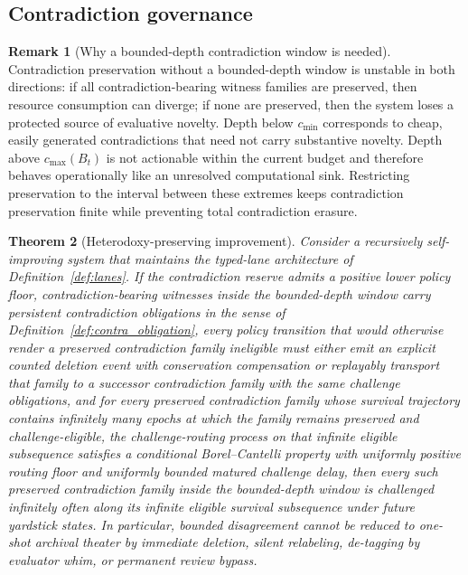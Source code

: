 \documentclass[11pt]{article}
\newtheorem{theorem}{Theorem}[section]
\theoremstyle{definition}
\newtheorem{remark}[theorem]{Remark}
\newcommand{\1}{\mathbf{1}}
\begin{document}
\subsection{Contradiction governance}
\begin{remark}[Why a bounded-depth contradiction window is needed]\label{rem:bounded_depth_need}
Contradiction preservation without a bounded-depth window is unstable in both directions: if all contradiction-bearing witness families are preserved, then resource consumption can diverge; if none are preserved, then the system loses a protected source of evaluative novelty. Depth below $c_{\min}$ corresponds to cheap, easily generated contradictions that need not carry substantive novelty. Depth above $c_{\max}(B_t)$ is not actionable within the current budget and therefore behaves operationally like an unresolved computational sink. Restricting preservation to the interval between these extremes keeps contradiction preservation finite while preventing total contradiction erasure.
\end{remark}

\begin{theorem}[Heterodoxy-preserving improvement]\label{thm:heterodoxy}
Consider a recursively self-improving system that maintains the typed-lane architecture of Definition~\ref{def:lanes}. If the contradiction reserve admits a positive lower policy floor, contradiction-bearing witnesses inside the bounded-depth window carry persistent contradiction obligations in the sense of Definition~\ref{def:contra_obligation}, every policy transition that would otherwise render a preserved contradiction family ineligible must either emit an explicit counted deletion event with conservation compensation or replayably transport that family to a successor contradiction family with the same challenge obligations, and for every preserved contradiction family whose survival trajectory contains infinitely many epochs at which the family remains preserved and challenge-eligible, the challenge-routing process on that infinite eligible subsequence satisfies a conditional Borel--Cantelli property with uniformly positive routing floor and uniformly bounded matured challenge delay, then every such preserved contradiction family inside the bounded-depth window is challenged infinitely often along its infinite eligible survival subsequence under future yardstick states. In particular, bounded disagreement cannot be reduced to one-shot archival theater by immediate deletion, silent relabeling, de-tagging by evaluator whim, or permanent review bypass.
\end{theorem}
\end{document}

